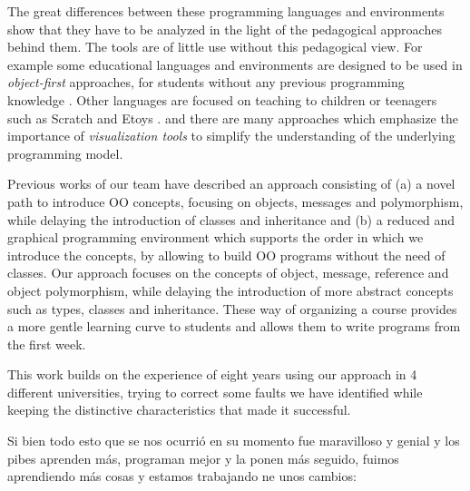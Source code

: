 The great differences between these programming languages and environments show that they have to be analyzed in the light of the pedagogical approaches behind them.
The tools are of little use without this pedagogical view.
For example some educational languages and environments are designed to be used in \textit{object-first} approaches, 
\ie for students without any previous programming knowledge \cite{1, 3, 12, 13 del paper de cooper}.
Other languages are focused on teaching to children or teenagers such as Scratch \cite{malan_scratch_2007} and Etoys \cite{lee_empowering_2011}. 
and there are many approaches which emphasize the importance of \emph{visualization tools} 
to simplify the understanding of the underlying programming model\cite{cooper_teaching_2003, Java Power Tools [11]}.


\medskip

Previous works of our team \cite{lombardi_instances_2007,lombardi_carlos_alumnos_2008,griggio_programming_2011,spigariol_lucas_ensenando_2013} have described an approach consisting of
(a) a novel path to introduce OO concepts, focusing on objects, messages and polymorphism, while delaying the introduction of classes and inheritance and 
(b) a reduced and graphical programming environment which supports the order in which we introduce the concepts, by allowing to build OO programs without the need of classes.
Our approach focuses on the concepts of object, message, reference and object polymorphism, while delaying the introduction of more abstract concepts such as types, classes and inheritance.
These way of organizing a course provides a more gentle learning curve to students and allows them to write programs from the first week.

This work builds on the experience of eight years using our approach in 4 different universities,
trying to correct some faults we have identified while keeping the distinctive characteristics that made it successful.

\medskip 




Si bien todo esto que se nos ocurrió en su momento fue maravilloso y genial y los pibes aprenden más, programan mejor y la ponen más seguido, fuimos aprendiendo más cosas y estamos trabajando ne unos cambios:

